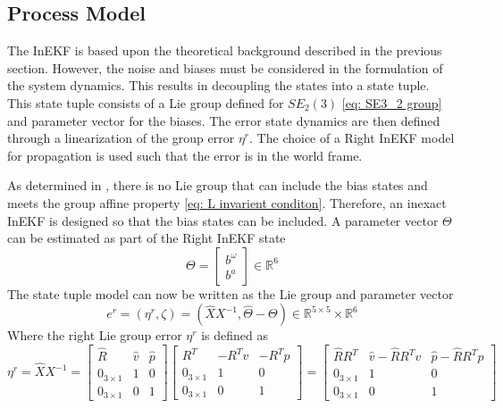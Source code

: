 \subsection{Process Model}
The InEKF is based upon the theoretical background described in the previous section. However, the noise and biases must be considered in the formulation of the system dynamics. This results in decoupling the states into a state tuple. This state tuple consists of a Lie group defined for $SE_2(3)$ \eqref{eq: SE3_2 group} and parameter vector for the biases. The error state dynamics are then defined through a linearization of the group error $\eta^r$. The choice of a Right InEKF model for propagation is used such that the error is in the world frame. 

As determined in \cite{DBLP:journals/corr/BarrauB14}, there is no Lie group that can include the bias states and meets the group affine property \eqref{eq: L invarient conditon}. Therefore, an inexact InEKF is designed so that the bias states can be included. A parameter vector $\Theta$ can be estimated as part of the Right InEKF state \cite{Contact-Aided_Invarant_EKF}
\begin{equation}
    \Theta = \begin{bmatrix}
        b^{\omega} \\
        b^a
    \end{bmatrix}  \in \mathbb{R}^6
    \label{eq: Theta RInEKF}
\end{equation}
The state tuple model can now be written as the Lie group and parameter vector \cite{Contact-Aided_Invarant_EKF}
\begin{equation}
    e^r = (\eta^r, \zeta) = (\hat{X} X^{-1}, \hat{\Theta} - \Theta) \in \mathbb{R}^{5 \times 5} \times \mathbb{R}^6
    \label{eq: e^r state tuple}
\end{equation}
Where the right Lie group error $\eta^r$ is defined as
\begin{equation}
    \eta^r = \hat{X} X^{-1} = 
        \begin{bmatrix}
            \hat{R} & \hat{v} & \hat{p}\\
            0_{3 \times 1} & 1 & 0\\
            0_{3 \times 1} & 0 & 1
        \end{bmatrix}
        \begin{bmatrix}
            R^T & -R^T v & -R^T p \\
            0_{3 \times 1} & 1 & 0\\
            0_{3 \times 1} & 0 & 1
        \end{bmatrix} =
        \begin{bmatrix}
            \hat{R} R^T & \hat{v} - \hat{R} R^T v & \hat{p} - \hat{R} R^T p\\
            0_{3 \times 1} & 1 & 0\\
            0_{3 \times 1} & 0 & 1
        \end{bmatrix}
    \label{eq: eta^r full}
\end{equation}
